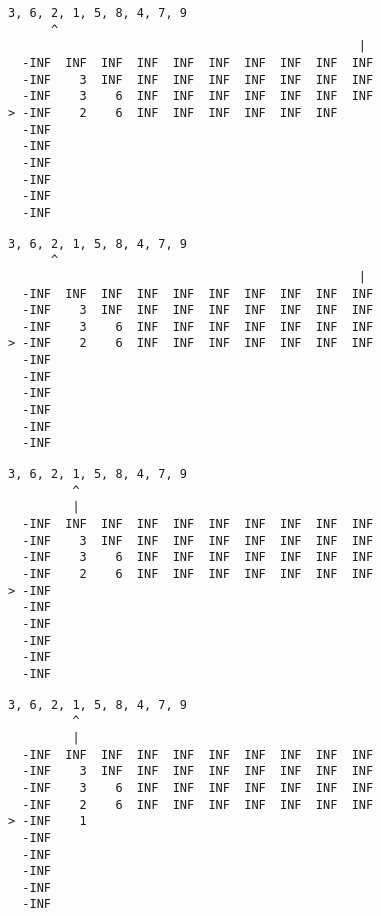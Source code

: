 { \begin{verbatim}
3, 6, 2, 1, 5, 8, 4, 7, 9
      ^
                                                 |
  -INF  INF  INF  INF  INF  INF  INF  INF  INF  INF
  -INF    3  INF  INF  INF  INF  INF  INF  INF  INF
  -INF    3    6  INF  INF  INF  INF  INF  INF  INF
> -INF    2    6  INF  INF  INF  INF  INF  INF     
  -INF                                             
  -INF                                             
  -INF                                             
  -INF                                             
  -INF                                             
  -INF                                             
\end{verbatim} }

{ \begin{verbatim}
3, 6, 2, 1, 5, 8, 4, 7, 9
      ^
                                                 |
  -INF  INF  INF  INF  INF  INF  INF  INF  INF  INF
  -INF    3  INF  INF  INF  INF  INF  INF  INF  INF
  -INF    3    6  INF  INF  INF  INF  INF  INF  INF
> -INF    2    6  INF  INF  INF  INF  INF  INF  INF
  -INF                                             
  -INF                                             
  -INF                                             
  -INF                                             
  -INF                                             
  -INF                                             
\end{verbatim} }

{ \begin{verbatim}
3, 6, 2, 1, 5, 8, 4, 7, 9
         ^
         |
  -INF  INF  INF  INF  INF  INF  INF  INF  INF  INF
  -INF    3  INF  INF  INF  INF  INF  INF  INF  INF
  -INF    3    6  INF  INF  INF  INF  INF  INF  INF
  -INF    2    6  INF  INF  INF  INF  INF  INF  INF
> -INF                                             
  -INF                                             
  -INF                                             
  -INF                                             
  -INF                                             
  -INF                                             
\end{verbatim} }

{ \begin{verbatim}
3, 6, 2, 1, 5, 8, 4, 7, 9
         ^
         |
  -INF  INF  INF  INF  INF  INF  INF  INF  INF  INF
  -INF    3  INF  INF  INF  INF  INF  INF  INF  INF
  -INF    3    6  INF  INF  INF  INF  INF  INF  INF
  -INF    2    6  INF  INF  INF  INF  INF  INF  INF
> -INF    1                                        
  -INF                                             
  -INF                                             
  -INF                                             
  -INF                                             
  -INF                                             
\end{verbatim} }

